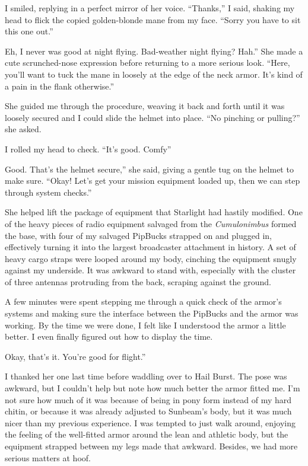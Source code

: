 I smiled, replying in a perfect mirror of her voice. “Thanks,” I said, shaking my head to flick the copied golden-blonde mane from my face. “Sorry you have to sit this one out.”

\leavevmode{}Eh, I never was good at night flying. Bad-weather night flying? Hah.” She made a cute scrunched-nose expression before returning to a more serious look. “Here, you’ll want to tuck the mane in loosely at the edge of the neck armor. It’s kind of a pain in the flank otherwise.”

She guided me through the procedure, weaving it back and forth until it was loosely secured and I could slide the helmet into place. “No pinching or pulling?” she asked.

I rolled my head to check. “It’s good. Comfy”

\leavevmode{}Good. That’s the helmet secure,” she said, giving a gentle tug on the helmet to make sure. “Okay! Let’s get your mission equipment loaded up, then we can step through system checks.”

She helped lift the package of equipment that Starlight had hastily modified. One of the heavy pieces of radio equipment salvaged from the \textit{Cumulonimbus} formed the base, with four of my salvaged PipBucks strapped on and plugged in, effectively turning it into the largest broadcaster attachment in history. A set of heavy cargo straps were looped around my body, cinching the equipment snugly against my underside. It was awkward to stand with, especially with the cluster of three antennas protruding from the back, scraping against the ground.

A few minutes were spent stepping me through a quick check of the armor’s systems and making sure the interface between the PipBucks and the armor was working. By the time we were done, I felt like I understood the armor a little better. I even finally figured out how to display the time.

\leavevmode{}Okay, that’s it. You’re good for flight.”

I thanked her one last time before waddling over to Hail Burst. The pose was awkward, but I couldn’t help but note how much better the armor fitted me. I’m not sure how much of it was because of being in pony form instead of my hard chitin, or because it was already adjusted to Sunbeam’s body, but it was much nicer than my previous experience. I was tempted to just walk around, enjoying the feeling of the well-fitted armor around the lean and athletic body, but the equipment strapped between my legs made that awkward. Besides, we had more serious matters at hoof.

